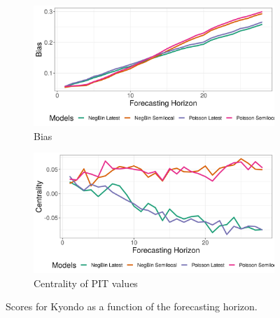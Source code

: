 \begin{figure}[H]
\begin{subfigure}{0.5\textwidth}
  \centering
  \includegraphics[width=\linewidth]{../output/Kyondo_bias.png}  
  \caption{Bias}
  \label{fig:Kyondo_scores_3}
\end{subfigure}
\begin{subfigure}{0.5\textwidth}
  \centering
  \includegraphics[width=\linewidth]{../output/Kyondo_centrality.png}  
  \caption{Centrality of PIT values}
  \label{fig:Kyondo_scores_4}
\end{subfigure}
  \caption{Scores for Kyondo as a function of the forecasting horizon.}

  \label{fig:nat_scores}
\end{figure}

